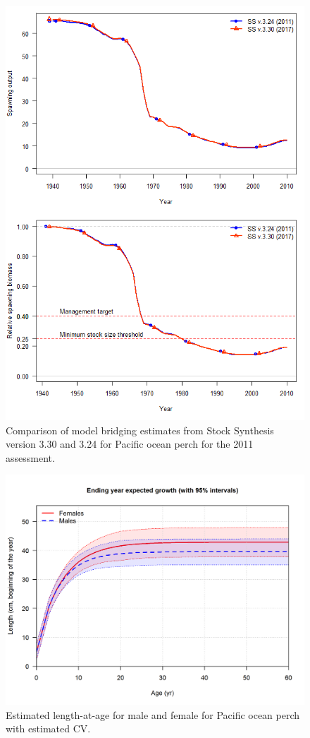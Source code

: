 \documentclass[12pt,]{article}
\begin{document}
\begin{figure}
\centering
\includegraphics{Figures/bridging.png}
\caption{Comparison of model bridging estimates from Stock Synthesis
version 3.30 and 3.24 for Pacific ocean perch for the 2011 assessment.
\label{fig:bridge}}
\end{figure}

\FloatBarrier 

\begin{figure}
\centering
\includegraphics{r4ss/plots_mod1/bio1_sizeatage.png}
\caption{Estimated length-at-age for male and female for Pacific ocean
perch with estimated CV. \label{fig:sizeatage}}
\end{figure}
\end{document}
